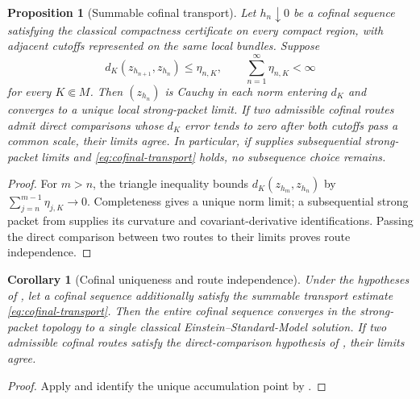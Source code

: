 \documentclass[11pt]{article}
\numberwithin{equation}{section}
\newtheorem{proposition}[proposition]{Proposition}
\newtheorem{corollary}[corollary]{Corollary}
\theoremstyle{definition}
\theoremstyle{remark}
\begin{document}
\begin{proposition}[Summable cofinal transport]
\label{prop:cofinal-transport}
Let $h_n\downarrow0$ be a cofinal sequence satisfying the classical compactness certificate on every compact region, with adjacent cutoffs represented on the same local bundles.  Suppose
\begin{equation}
 d_K(z_{h_{n+1}},z_{h_n})\le\eta_{n,K},
 \qquad \sum_{n=1}^\infty\eta_{n,K}<\infty
 \label{eq:cofinal-transport}
\end{equation}
for every $K\Subset M$.  Then $(z_{h_n})$ is Cauchy in each norm entering $d_K$ and converges to a unique local strong-packet limit.  If two admissible cofinal routes admit direct comparisons whose $d_K$ error tends to zero after both cutoffs pass a common scale, their limits agree.  In particular, if  supplies subsequential strong-packet limits and \eqref{eq:cofinal-transport} holds, no subsequence choice remains.
\end{proposition}
\begin{proof}
For $m>n$, the triangle inequality bounds
$d_K(z_{h_m},z_{h_n})$ by $\sum_{j=n}^{m-1}\eta_{j,K}\to0$.
Completeness gives a unique norm limit; a subsequential strong packet from
 supplies its curvature and covariant-derivative
identifications. Passing the direct comparison between two routes to their
limits proves route independence.
\end{proof}

\begin{corollary}[Cofinal uniqueness and route independence]
\label{cor:cofinal-unique}
Under the hypotheses of , let a cofinal sequence additionally satisfy the summable transport estimate \eqref{eq:cofinal-transport}. Then the entire cofinal sequence converges in the strong-packet topology to a single classical Einstein--Standard-Model solution. If two admissible cofinal routes satisfy the direct-comparison hypothesis of , their limits agree.
\end{corollary}
\begin{proof}
Apply  and identify the unique accumulation
point by .
\end{proof}
\end{document}
